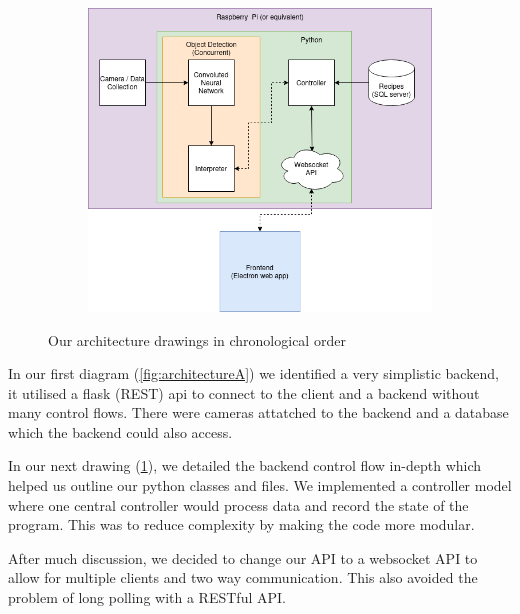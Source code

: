 \documentclass{article}
\begin{document}
\begin{figure}[t]
\begin{subfigure}{0.45\linewidth}
        \caption{}
        \label{fig:architectureB}
      \end{subfigure}
      \vfill
      \begin{subfigure}{0.5\linewidth}
        \includegraphics[width=\linewidth]{assets/final-architecture.png}
        \caption{}
        \label{fig:architectureC}
      \end{subfigure}
      \caption{Our architecture drawings in chronological order}
      \label{fig:architectures}
    \end{figure}

    In our first diagram (\ref{fig:architectureA}) we identified a very simplistic backend, it utilised a flask (REST) api to connect to the client and a backend without many control flows. There were cameras attatched to the backend and a database which the backend could also access.

    In our next drawing (\ref{fig:architectureB}), we detailed the backend control flow in-depth which helped us outline our python classes and files. We implemented a controller model where one central controller would process data and record the state of the program. This was to reduce complexity by making the code more modular.

    After much discussion, we decided to change our API to a websocket API to allow for multiple clients and two way communication. This also avoided the problem of long polling with a RESTful API.
\end{document}
